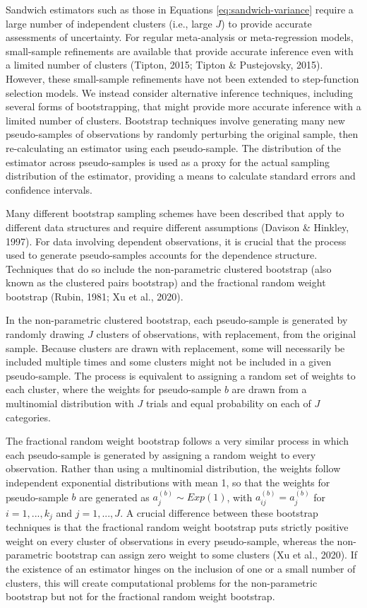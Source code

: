 \documentclass[
  man, donotrepeattitle,floatsintext]{apa7}
\begin{document}
Sandwich estimators such as those in Equations \eqref{eq:sandwich-variance} require a large number of independent clusters (i.e., large \(J\)) to provide accurate assessments of uncertainty.
For regular meta-analysis or meta-regression models, small-sample refinements are available that provide accurate inference even with a limited number of clusters (Tipton, 2015; Tipton \& Pustejovsky, 2015).
However, these small-sample refinements have not been extended to step-function selection models.
We instead consider alternative inference techniques, including several forms of bootstrapping, that might provide more accurate inference with a limited number of clusters.
Bootstrap techniques involve generating many new pseudo-samples of observations by randomly perturbing the original sample, then re-calculating an estimator using each pseudo-sample.
The distribution of the estimator across pseudo-samples is used as a proxy for the actual sampling distribution of the estimator, providing a means to calculate standard errors and confidence intervals.

Many different bootstrap sampling schemes have been described that apply to different data structures and require different assumptions (Davison \& Hinkley, 1997).
For data involving dependent observations, it is crucial that the process used to generate pseudo-samples accounts for the dependence structure.
Techniques that do so include the non-parametric clustered bootstrap (also known as the clustered pairs bootstrap) and the fractional random weight bootstrap (Rubin, 1981; Xu et al., 2020).

In the non-parametric clustered bootstrap, each pseudo-sample is generated by randomly drawing \(J\) clusters of observations, with replacement, from the original sample.
Because clusters are drawn with replacement, some will necessarily be included multiple times and some clusters might not be included in a given pseudo-sample.
The process is equivalent to assigning a random set of weights to each cluster, where the weights for pseudo-sample \(b\) are drawn from a multinomial distribution with \(J\) trials and equal probability on each of \(J\) categories.

The fractional random weight bootstrap follows a very similar process in which each pseudo-sample is generated by assigning a random weight to every observation.
Rather than using a multinomial distribution, the weights follow independent exponential distributions with mean 1, so that the weights for pseudo-sample \(b\) are generated as \(a^{(b)}_j \sim Exp(1)\), with \(a_{ij}^{(b)} = a^{(b)}_j\) for \(i = 1,...,k_j\) and \(j = 1,...,J\).
A crucial difference between these bootstrap techniques is that the fractional random weight bootstrap puts strictly positive weight on every cluster of observations in every pseudo-sample, whereas the non-parametric bootstrap can assign zero weight to some clusters (Xu et al., 2020).
If the existence of an estimator hinges on the inclusion of one or a small number of clusters, this will create computational problems for the non-parametric bootstrap but not for the fractional random weight bootstrap.
\end{document}
